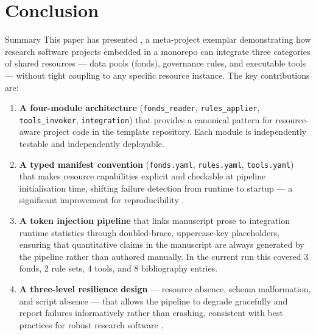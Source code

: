\documentclass[
  ignorenonframetext,
]{beamer}
\author{\texorpdfstring{}{}}
\date{}
\begin{document}
\section{Conclusion}\label{sec:conclusion}

\begin{frame}{Summary}
\protect{}\label{summary}
This paper has presented , a
meta-project exemplar demonstrating how research software projects
embedded in a monorepo can integrate three categories of shared
resources --- data pools (fonds), governance rules, and executable tools
--- without tight coupling to any specific resource instance. The key
contributions are:

\begin{enumerate}
\item
  \textbf{A four-module architecture} (\texttt{fonds\_reader},
  \texttt{rules\_applier}, \texttt{tools\_invoker},
  \texttt{integration}) that provides a canonical pattern for
  resource-aware project code in the template repository. Each module is
  independently testable and independently deployable.
\item
  \textbf{A typed manifest convention} (\texttt{fonds.yaml},
  \texttt{rules.yaml}, \texttt{tools.yaml}) that makes resource
  capabilities explicit and checkable at pipeline initialisation time,
  shifting failure detection from runtime to startup --- a significant
  improvement for reproducibility .
\item
  \textbf{A token injection pipeline} that links manuscript prose to
  integration runtime statistics through doubled-brace, uppercase-key
  placeholders, ensuring that quantitative claims in the manuscript are
  always generated by the pipeline rather than authored manually. In the
  current run this covered 3 fonds, 2 rule sets, 4 tools, and 8
  bibliography entries.
\item
  \textbf{A three-level resilience design} --- resource absence, schema
  malformation, and script absence --- that allows the pipeline to
  degrade gracefully and report failures informatively rather than
  crashing, consistent with best practices for robust research software
  .
\end{enumerate}
\end{frame}
\end{document}
